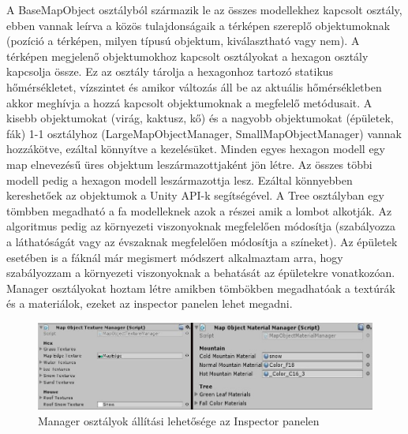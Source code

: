 A BaseMapObject osztályból származik le az összes modellekhez kapcsolt osztály, ebben vannak leírva a közös tulajdonságaik a térképen szereplő objektumoknak (pozíció a térképen, milyen típusú objektum, kiválasztható vagy nem). A térképen megjelenő objektumokhoz kapcsolt osztályokat a hexagon osztály kapcsolja össze. Ez az osztály tárolja  a hexagonhoz tartozó statikus hőmérsékletet, vízszintet és amikor változás áll be az aktuális hőmérsékletben akkor meghívja a hozzá kapcsolt objektumoknak a megfelelő metódusait. A kisebb objektumokat (virág, kaktusz, kő) és a nagyobb objektumokat (épületek, fák) 1-1 osztályhoz (LargeMapObjectManager, SmallMapObjectManager) vannak hozzákötve, ezáltal könnyítve a kezelésüket.
\newline
\newline Minden egyes hexagon modell egy map elnevezésű üres objektum leszármazottjaként jön létre. Az összes többi modell pedig a hexagon modell leszármazottja lesz. Ezáltal könnyebben kereshetőek az objektumok a Unity API-k segítségével.
\newline
\newline A Tree osztályban egy tömbben megadható a fa modelleknek azok a részei amik a lombot alkotják. Az algoritmus pedig az környezeti viszonyoknak megfelelően módosítja (szabályozza a láthatóságát vagy az évszaknak megfelelően módosítja a színeket).
\newline
\newline Az épületek esetében is a fáknál már megismert módszert alkalmaztam arra, hogy szabályozzam a környezeti viszonyoknak a behatását az épületekre vonatkozóan.
\newline
\newline Manager osztályokat hoztam létre amikben tömbökben megadhatóak a textúrák és a materiálok, ezeket az inspector panelen lehet megadni.

\begin{figure}[h!]
\centering
\includegraphics[scale=0.6]{kepek/Managers.jpg}
\caption{Manager osztályok állítási lehetősége az Inspector panelen}
\label{fig:Managers}
\end{figure}

\newpage
